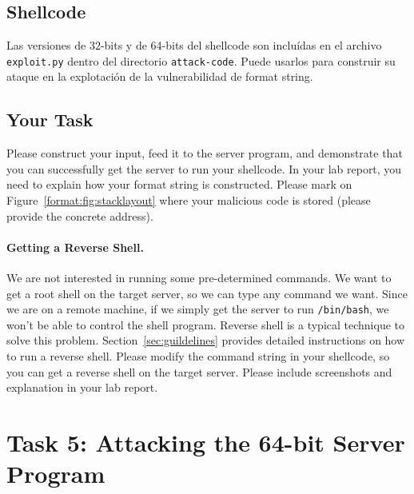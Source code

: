 \subsection{Shellcode} 



Las versiones de 32-bits y de 64-bits del shellcode son incluídas en el archivo \texttt{exploit.py} dentro del directorio \texttt{attack-code}. 
Puede usarlos para construir su ataque en la explotación de la vulnerabilidad de format string.


\subsection{Your Task} 

Please construct your input, feed it to the server program, and demonstrate that you can
successfully get the server to run your shellcode. 
In your lab report, you need to explain
how your format string is constructed. Please mark on Figure~\ref{format:fig:stacklayout} where 
your malicious code is stored (please provide the concrete address). 


\paragraph{Getting a Reverse Shell.}
We are not interested in running some pre-determined commands. We
want to get a root shell on the target server, so we can
type any command we want. Since we are on a remote machine,
if we simply get the server to run \texttt{/bin/bash}, we won't be able to
control the shell program. Reverse shell is a typical
technique to solve this problem. Section~\ref{sec:guildelines} provides
detailed instructions on how to run a reverse shell.
Please modify the command string in your shellcode, so you can
get a reverse shell on the target server.
Please include screenshots and explanation in your lab report.



\section{Task 5: Attacking the 64-bit Server Program}

